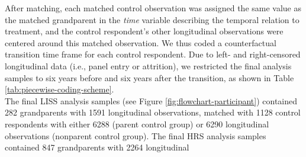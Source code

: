 \documentclass[
  english,
  man, noextraspace,floatsintext]{apa7}
\begin{document}
After matching, each matched control observation was assigned the same value as the matched grandparent in the \emph{time} variable describing the temporal relation to treatment, and the control respondent's other longitudinal observations were centered around this matched observation. We thus coded a counterfactual transition time frame for each control respondent. Due to left- and right-censored longitudinal data (i.e., panel entry or attrition), we restricted the final analysis samples to six years before and six years after the transition, as shown in Table \ref{tab:piecewise-coding-scheme}.\\
The final LISS analysis samples (see Figure \ref{fig:flowchart-participant}) contained 282 grandparents with 1591 longitudinal observations, matched with 1128 control respondents with either 6288 (parent control group) or 6290 longitudinal observations (nonparent control group). The final HRS analysis samples contained 847 grandparents with 2264 longitudinal
\end{document}
